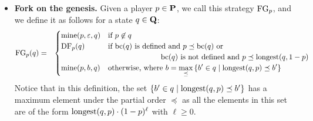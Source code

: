 \begin{itemize}
\item {\bf Fork on the genesis.} Given a player $p \in \mathbf{P}$, we call this strategy $\text{\rm FG}_p$, and we define it as follows for a state $q \in \mathbf{Q}$:
\begin{eqnarray*}
\text{\rm FG}_p(q) & = &
\begin{cases}
\text{\rm mine}(p,\varepsilon,q) & \text{if } p \not\in q\\
\text{\rm DF}_p(q) & \text{if } \text{bc}(q) \text{ is defined and } p \preceq \text{bc}(q) \text{ or}\\
& \hspace{70pt} \text{bc}(q) \text{ is not defined and } p \preceq {\text{\rm longest}}(q,1-p)\\
\text{\rm mine}(p,b,q) &  \text{otherwise, where } {\displaystyle b = \max_{\preceq} \, \{ b' \in q \mid {\text{\rm longest}}(q,p) \preceq b'\}}
\end{cases}
\end{eqnarray*}
Notice that in this definition, the set $\{ b' \in q \mid {\text{\rm longest}}(q,p) \preceq b'\}$ has a maximum element under the partial order $\preceq$ as all the elements in this set are of the form ${\text{\rm longest}}(q,p) \cdot (1-p)^\ell$ with $\ell \geq 0$.


\end{itemize}
